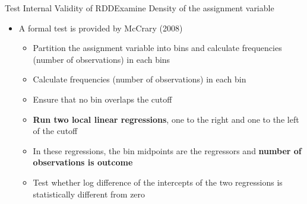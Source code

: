 \documentclass[dvipsnames,hyperref={pdfpagelabels=false}]{beamer}
\begin{document}
\begin{frame}{Test Internal Validity of RDD}{Examine Density of the assignment variable}
	
	
	\begin{itemize}
		\vspace{0.2cm}	
		\item A formal test is provided by McCrary (2008)
		\vspace{0.2cm}		
		\begin{itemize}
			\item[1] Partition the assignment variable into bins and calculate frequencies (number of observations) in each bins
			\vspace{0.2cm}
			\item[2] Calculate frequencies (number of observations) in each bin	 
			\vspace{0.2cm}
			\item[3] Ensure that no bin overlaps the cutoff
			\vspace{0.2cm}
			\item[4] \textbf{Run two local linear regressions}, one to the right and one to the left of the cutoff
			\vspace{0.2cm}
			\item[5] In these regressions,  the bin midpoints
			are the regressors and \textbf{number of observations is outcome}
			\vspace{0.2cm}
			\item[6] Test whether log difference of the intercepts of the two regressions
			is statistically different from zero	
			
			
		\end{itemize}
		
		
		
	\end{itemize}
\end{frame}
\end{document}

